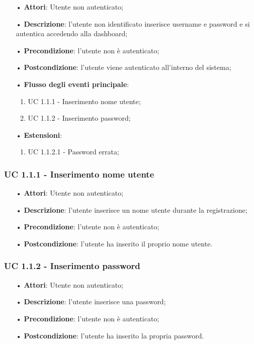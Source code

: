 \begin{itemize}
\item[•]\textbf{Attori}: Utente non autenticato;
\item[•]\textbf{Descrizione}:  l’utente non identificato inserisce username e password e si autentica accedendo alla dashboard;
\item[•]\textbf{Precondizione}: l’utente non è autenticato;
\item[•]\textbf{Postcondizione}: l’utente viene autenticato all’interno del sistema;
\item[•]\textbf{Flusso degli eventi principale}:
\begin{enumerate}
\item UC 1.1.1 - Inserimento nome utente;
\item UC 1.1.2 - Inserimento password;

\end{enumerate}
\item[•]\textbf{Estensioni}:
\begin{enumerate}
\item UC 1.1.2.1 - Password errata;
\end{enumerate}
\end{itemize}

\subsubsection{UC 1.1.1 - Inserimento nome utente}
\begin{itemize}
\item[•]\textbf{Attori}: Utente non autenticato;
\item[•]\textbf{Descrizione}: l’utente inserisce un nome utente durante la registrazione;
\item[•]\textbf{Precondizione}: l’utente non è autenticato;
\item[•]\textbf{Postcondizione}: l’utente ha inserito il proprio nome utente.
\end{itemize}

\subsubsection{UC 1.1.2 - Inserimento password}
\begin{itemize}
\item[•]\textbf{Attori}: Utente non autenticato;
\item[•]\textbf{Descrizione}: l’utente inserisce una password;
\item[•]\textbf{Precondizione}: l'utente non è autenticato;
\item[•]\textbf{Postcondizione}: l'utente ha inserito la propria password.
\end{itemize}
